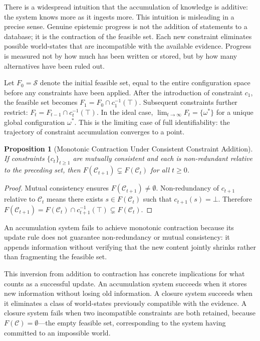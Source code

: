 \documentclass[12pt, oneside]{article}
\newtheorem{proposition}{Proposition}
\begin{document}
There is a widespread intuition that the accumulation of knowledge is additive: the system knows more as it ingests more. This intuition is misleading in a precise sense. Genuine epistemic progress is not the addition of statements to a database; it is the contraction of the feasible set. Each new constraint eliminates possible world-states that are incompatible with the available evidence. Progress is measured not by how much has been written or stored, but by how many alternatives have been ruled out.

Let $F_0 = \mathcal{S}$ denote the initial feasible set, equal to the entire configuration space before any constraints have been applied. After the introduction of constraint $c_1$, the feasible set becomes $F_1 = F_0 \cap c_1^{-1}(\top)$. Subsequent constraints further restrict: $F_t = F_{t-1} \cap c_t^{-1}(\top)$. In the ideal case, $\lim_{t \to \infty} F_t = \{\omega^*\}$ for a unique global configuration $\omega^*$. This is the limiting case of full identifiability: the trajectory of constraint accumulation converges to a point.

\begin{proposition}[Monotonic Contraction Under Consistent Constraint Addition]
If constraints $\{c_t\}_{t \geq 1}$ are mutually consistent and each is non-redundant relative to the preceding set, then $F(\mathcal{C}_{t+1}) \subsetneq F(\mathcal{C}_t)$ for all $t \geq 0$.
\end{proposition}

\begin{proof}
Mutual consistency ensures $F(\mathcal{C}_{t+1}) \neq \emptyset$. Non-redundancy of $c_{t+1}$ relative to $\mathcal{C}_t$ means there exists $s \in F(\mathcal{C}_t)$ such that $c_{t+1}(s) = \bot$. Therefore $F(\mathcal{C}_{t+1}) = F(\mathcal{C}_t) \cap c_{t+1}^{-1}(\top) \subsetneq F(\mathcal{C}_t)$.
\end{proof}

An accumulation system fails to achieve monotonic contraction because its update rule does not guarantee non-redundancy or mutual consistency: it appends information without verifying that the new content jointly shrinks rather than fragmenting the feasible set.

This inversion from addition to contraction has concrete implications for what counts as a successful update. An accumulation system succeeds when it stores new information without losing old information. A closure system succeeds when it eliminates a class of world-states previously compatible with the evidence. A closure system fails when two incompatible constraints are both retained, because $F(\mathcal{C}) = \emptyset$---the empty feasible set, corresponding to the system having committed to an impossible world.
\end{document}
